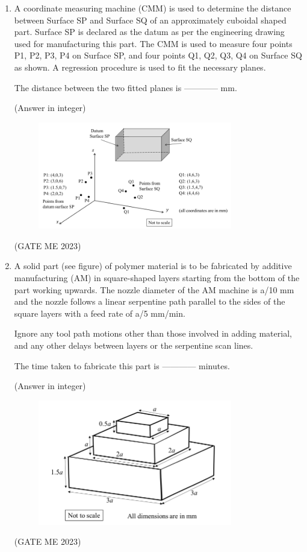 \documentclass[journal]{IEEEtran}
\begin{document}
\begin{enumerate}
\item A coordinate measuring machine (CMM) is used to determine the distance between Surface SP and Surface SQ of an approximately cuboidal shaped part. Surface SP is declared as the datum as per the engineering drawing used for manufacturing this part. The CMM is used to measure four points P1, P2, P3, P4 on Surface SP, and four points Q1, Q2, Q3, Q4 on Surface SQ as shown. A regression procedure is used to fit the necessary planes.

The distance between the two fitted planes is ------------ mm. 

(Answer in integer)

\begin{figure}[H]
\centering
\includegraphics[width=0.8\textwidth]{Fig 48.png}
\caption{}
\label{fig:question54}
\end{figure}
\hfill (GATE ME 2023)

\item A solid part (see figure) of polymer material is to be fabricated by additive manufacturing (AM) in square-shaped layers starting from the bottom of the part working upwards. The nozzle diameter of the AM machine is a/10 mm and the nozzle follows a linear serpentine path parallel to the sides of the square layers with a feed rate of a/5 mm/min.

Ignore any tool path motions other than those involved in adding material, and any other delays between layers or the serpentine scan lines.

The time taken to fabricate this part is ------------ minutes.

(Answer in integer)

\begin{figure}[H]
\centering
\includegraphics[width=0.8\textwidth]{Fig 49.png}
\caption{}
\label{fig:question55}
\end{figure}
\hfill (GATE ME 2023)


\end{enumerate}
\end{document}
